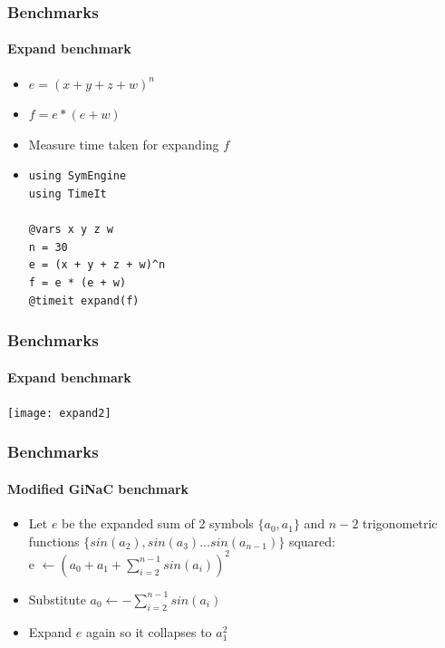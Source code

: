 \documentclass{beamer}
\begin{document}
\begin{frame}[fragile]
\frametitle{Benchmarks}
\framesubtitle{Expand benchmark}
\begin{itemize}
\item $ e = (x + y + z + w) ^ n $
\item $ f = e * (e + w) $
\item Measure time taken for expanding $f$
\linebreak
\item
\begin{verbatim}
using SymEngine
using TimeIt

@vars x y z w
n = 30
e = (x + y + z + w)^n
f = e * (e + w)
@timeit expand(f)
\end{verbatim}

\end{itemize}
\end{frame}


\begin{frame}
\frametitle{Benchmarks}
\framesubtitle{Expand benchmark}
\texttt{[image: expand2]}
\end{frame}





\begin{frame}
\frametitle{Benchmarks}
\framesubtitle{Modified GiNaC benchmark}
\begin{itemize}
\item Let $e$ be the expanded sum of 2 symbols $\{a_0, a_1\}$ and $n-2$ trigonometric functions $\{sin(a_2), sin(a_3)...sin(a_{n-1})\}$ squared:\\
e $\leftarrow (a_0+a_1+\sum_{i=2}^{n-1} sin(a_i))^2$
\item Substitute $a_0 \leftarrow -\sum_{i=2}^{n-1} sin(a_i)$
\item Expand $e$ again so it collapses to $a_1^2$
\end{itemize}
\end{frame}
\end{document}

